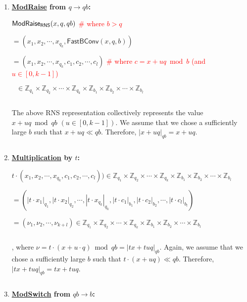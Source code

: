 \begin{enumerate}

\item \textbf{\underline{\textsf{ModRaise}} from $q \rightarrow qb$:}

$\textsf{ModRaise\textsubscript{RNS}}(x, q, qb)$ \textcolor{red}{ \# where $b > q$}

$= (x_1, x_2, \cdots, x_{q_k}, \textsf{FastBConv}(x, q, b))$

$= (x_1, x_2, \cdots, x_{q_k}, c_1, c_2, \cdots, c_l)$
 \textcolor{red}{ \# where $c = x + uq \bmod b$ (and $u \in [0, k - 1]$)}
 
$ 
\text{ } \in \mathbb{Z}_{q_1} \times \mathbb{Z}_{q_2} \times \cdots \times \mathbb{Z}_{q_k} \times \mathbb{Z}_{b_1} \times \mathbb{Z}_{b_2} \times \cdots \times \mathbb{Z}_{b_l}$   

$ $ 

The above RNS representation collectively represents the value $x + uq \bmod qb$  $(u \in [0, k - 1])$. We assume that we chose a sufficiently large $b$ such that $x + uq \ll qb$. Therefore, $|x + uq|_{qb} = x + uq$.

$ $

\item \textbf{\underline{Multiplication} by $t$:} 

$t\cdot 
(x_1, x_2, \cdots, x_{q_k}, c_1, c_2, \cdots, c_l))
\in \mathbb{Z}_{q_1} \times \mathbb{Z}_{q_2} \times \cdots \times \mathbb{Z}_{q_k} \times \mathbb{Z}_{b_1} \times \mathbb{Z}_{b_2} \times \cdots \times \mathbb{Z}_{b_l}$

$ = 
(|t\cdot x_1|_{q_1}, |t\cdot x_2|_{q_2}, \cdots, |t\cdot x_{q_k}|_{q_k}, |t\cdot c_1|_{b_1}, |t\cdot c_2|_{b_2}, \cdots, |t\cdot c_l|_{b_l})$ 


$ = (\nu_1, \nu_2, \cdots, \nu_{k+l}) \in \mathbb{Z}_{q_1} \times \mathbb{Z}_{q_2} \times \cdots \times \mathbb{Z}_{q_k} \times \mathbb{Z}_{b_1} \times \mathbb{Z}_{b_2} \times \cdots \times \mathbb{Z}_{b_l}$

$ $

, where $\nu = t\cdot (x + u\cdot q) \bmod qb = |tx + tuq|_{qb}$. Again, we assume that we chose a sufficiently large $b$ such that $t\cdot(x + uq) \ll qb$. Therefore, $|tx + tuq|_{qb} = tx + tuq$.

$ $

\item \textbf{\underline{\textsf{ModSwitch}} from $qb \rightarrow b$:}




\end{enumerate}
